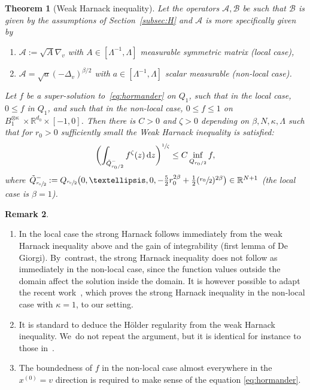\documentclass[10pt,a4paper]{amsart}
\providecommand{\skpt}{\smallskip}
\newenvironment{enumeratei}
{\bgroup\def\theenumi{\roman{enumi}}\def\theenumii{\arabic{enumii}}\begin{enumerate}}
{\end{enumerate}\egroup}
\newtheorem{theorem}{Theorem}
\theoremstyle{definition}
\newtheorem{remark}[theorem]{Remark}
\newcommand\R{{\mathbb R}}
\newcommand{\cA}{{\mathcal A}}
\newcommand{\cB}{{\mathcal B}}
\newcommand{\dd}{{\, \mathrm d}}
\begin{document}
\begin{theorem}[Weak Harnack inequality]
\label{thm:weak_harnack_nonlocal}
Let the operators $\cA, \cB$ be such that $\cB$ is given by
the assumptions of Section~\ref{subsec:H} and $\cA$ is more specifically given by
\begin{enumeratei}
\item
$\cA:=\sqrt{A} \nabla_{v}$ with
$A \in [\Lambda^{-1},\Lambda]$ measurable symmetric matrix (local
case),
\item
$\cA = \sqrt{a} (-\Delta_v)^{\beta/2}$ with
$a \in [\Lambda^{-1},\Lambda]$ scalar measurable (non-local
case).
\end{enumeratei}
Let $f$ be a super-solution to~\eqref{eq:hormander} on $Q_1$, such that in the local case, $0 \leq f $ in $Q_1$, and such that in the non-local case,
$0 \le f \le 1$ on $B_1^{\otimes \kappa} \ \times \R^{d_0} \times [-1, 0]$. Then there is $C > 0$
and $\zeta > 0$ depending on $\beta, N, \kappa, \Lambda$ such
that for $r_0 > 0$ sufficiently small the Weak Harnack
inequality is satisfied:\vspace*{-3pt}
\begin{equation}
\biggl(\int_{\tilde Q^-_{r_0/2}} f^\zeta(z) \dd
z\biggr)^{\sfrac{1}{\zeta}} \leq C \inf_{Q_{r_0/2}} f,
\end{equation}
where
$\tilde Q_{\sfrac{r_0}{2}}^- := Q_{\sfrac{r_0}{2}}\big(0, \dots,
0, -\frac{5}{2} r_0^{2\beta} +\frac{1}{2}
(\sfrac{r_0}{2})^{2\beta}\big)\in \R^{N+1}$ (the local
case is $\beta=1$).
\end{theorem}


\pagebreak[2]
\skpt
\begin{remark}
\begin{enumerate}
\item In the local case the strong Harnack follows immediately
from the weak Harnack inequality above and the gain of
integrability (first lemma of De Giorgi). By~contrast, the
strong Harnack inequality does not follow as immediately in
the non-local case, since the function values outside the
domain affect the solution inside the domain. It is however
possible to adapt the recent work~\cite{APP, Loher-2023, Loher-2024}, which
proves the strong Harnack inequality in the non-local case
with $\kappa = 1$, to our setting.
\item It is standard to deduce the Hölder regularity from the
weak Harnack inequality. We~do not repeat the argument, but it
is identical for instance to those
in~\cite{guerand-mouhot,loher-2022-preprint-quantitative-de-giorgi}.
\item The boundedness of $f$ in the non-local case almost everywhere in the $x^{(0)}=v$ direction is required to make sense of the equation \eqref{eq:hormander}.
\end{enumerate}
\end{remark}
\end{document}
